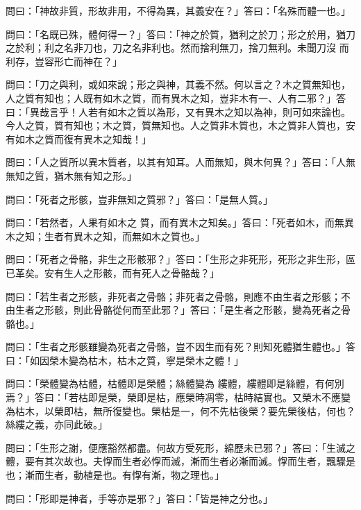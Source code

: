 \begin{pinyinscope}
 問曰：「神故非質，形故非用，不得為異，其義安在？」答曰：「名殊而體一也。」



 問曰：「名既已殊，體何得一？」答曰：「神之於質，猶利之於刀；形之於用，猶刀之於利；利之名非刀也，刀之名非利也。然而捨利無刀，捨刀無利。未聞刀沒
 而利存，豈容形亡而神在？」



 問曰：「刀之與利，或如來說；形之與神，其義不然。何以言之？木之質無知也，人之質有知也；人既有如木之質，而有異木之知，豈非木有一、人有二邪？」答曰：「異哉言乎！人若有如木之質以為形，又有異木之知以為神，則可如來論也。今人之質，質有知也；木之質，質無知也。人之質非木質也，木之質非人質也，安有如木之質而復有異木之知哉！」



 問曰：「人之質所以異木質者，以其有知耳。人而無知，與木何異？」答曰：「人無無知之質，猶木無有知之形。」



 問曰：「死者之形骸，豈非無知之質邪？」答曰：「是無人質。」



 問曰：「若然者，人果有如木之
 質，而有異木之知矣。」答曰：「死者如木，而無異木之知；生者有異木之知，而無如木之質也。」



 問曰：「死者之骨骼，非生之形骸邪？」答曰：「生形之非死形，死形之非生形，區已革矣。安有生人之形骸，而有死人之骨骼哉？」



 問曰：「若生者之形骸，非死者之骨骼；非死者之骨骼，則應不由生者之形骸；不由生者之形骸，則此骨骼從何而至此邪？」答曰：「是生者之形骸，變為死者之骨骼也。」



 問曰：「生者之形骸雖變為死者之骨骼，豈不因生而有死？則知死體猶生體也。」答曰：「如因榮木變為枯木，枯木之質，寧是榮木之體！」



 問曰：「榮體變為枯體，枯體即是榮體；絲體變為
 縷體，縷體即是絲體，有何別焉？」答曰：「若枯即是榮，榮即是枯，應榮時凋零，枯時結實也。又榮木不應變為枯木，以榮即枯，無所復變也。榮枯是一，何不先枯後榮？要先榮後枯，何也？絲縷之義，亦同此破。」



 問曰：「生形之謝，便應豁然都盡。何故方受死形，綿歷未已邪？」答曰：「生滅之體，要有其次故也。夫惸而生者必惸而滅，漸而生者必漸而滅。惸而生者，飄驟是也；漸而生者，動植是也。有惸有漸，物之理也。」



 問曰：「形即是神者，手等亦是邪？」答曰：「皆是神之分也。」




\end{pinyinscope}
